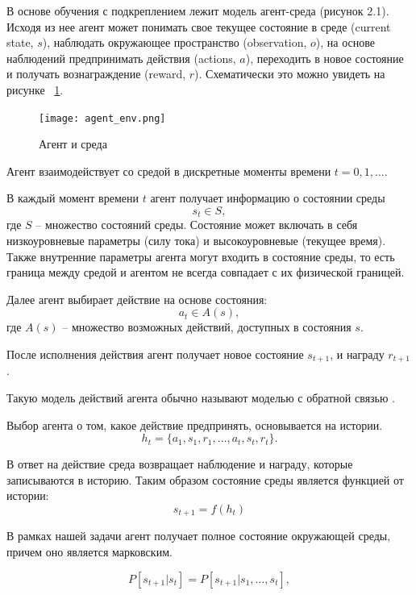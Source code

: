 В основе обучения с подкреплением лежит модель агент-среда (рисунок 2.1). Исходя из нее агент может понимать свое текущее состояние в среде (current state, $s$), наблюдать окружающее пространство (observation, $o$), на основе наблюдений предпринимать действия (actions, $a$), переходить в новое состояние и получать вознаграждение (reward, $r$). Схематически это можно увидеть на рисунке ~\ref{fig:ag-en}.

\begin{figure}[!h]
	\centering
	\texttt{[image: agent\_env.png]}	
	\caption {Агент и среда}
	\label{fig:ag-en}
\end{figure}

Агент взаимодействует со средой в дискретные моменты времени $t=0, 1, \dots$.

В каждый момент времени $t$ агент получает информацию о состоянии среды $$s_t \in S, $$ где $S$ – множество состояний среды. Состояние может включать в себя
низкоуровневые параметры (силу тока) и
высокоуровневые (текущее время). Также внутренние параметры агента могут входить в состояние среды, то есть граница
между средой и агентом не всегда совпадает с их физической границей.


Далее агент выбирает действие на основе состояния: $$a_t \in A(s),$$ 
где $A(s)$ – множество возможных действий, доступных в состояния $s$.

После исполнения действия агент получает новое состояние $s_{t+1}$, и награду $r_{t+1}$. 

Такую модель действий агента обычно называют моделью с обратной связью \cite{rl1}.


Выбор агента о том, какое действие предпринять, основывается на истории. 
\begin{equation}
    h_t = \{a_1, s_1, r_1, \dots, a_t, s_t, r_t\}.
\end{equation}

В ответ на действие среда возвращает наблюдение и награду, которые записываются в историю. Таким образом состояние среды является функцией от истории:
\begin{equation}
    s_{t+1} = f(h_t)
\end{equation}

В рамках нашей задачи агент получает полное состояние окружающей среды, причем оно  является марковским.

\begin{equation}
    P[s_{t+1} | s_t] = P[s_{t+1} | s_1, \dots, s_t],
\end{equation}


